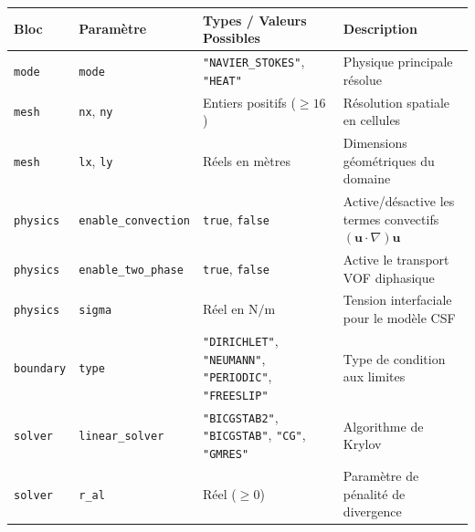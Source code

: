\documentclass[
  french,
]{article}
\newcounter{none} %
\begin{document}
{\def\LTcaptype{none} %
\begin{longtable}[]{@{}
  >{\raggedright\arraybackslash}p{}
  >{\raggedright\arraybackslash}p{}
  >{\raggedright\arraybackslash}p{}
  >{\raggedright\arraybackslash}p{}@{}}
\toprule\noalign{}
\begin{minipage}[b]{\linewidth}\raggedright
Bloc
\end{minipage} & \begin{minipage}[b]{\linewidth}\raggedright
Paramètre
\end{minipage} & \begin{minipage}[b]{\linewidth}\raggedright
Types / Valeurs Possibles
\end{minipage} & \begin{minipage}[b]{\linewidth}\raggedright
Description
\end{minipage} \\
\midrule\noalign{}
\endhead
\bottomrule\noalign{}
\endlastfoot
\texttt{mode} & \texttt{mode} & \texttt{"NAVIER\_STOKES"},
\texttt{"HEAT"} & Physique principale résolue \\
\texttt{mesh} & \texttt{nx}, \texttt{ny} & Entiers positifs (\(\ge 16\))
& Résolution spatiale en cellules \\
\texttt{mesh} & \texttt{lx}, \texttt{ly} & Réels en mètres & Dimensions
géométriques du domaine \\
\texttt{physics} & \texttt{enable\_convection} & \texttt{true},
\texttt{false} & Active/désactive les termes convectifs
\((\mathbf{u}\cdot\nabla)\mathbf{u}\) \\
\texttt{physics} & \texttt{enable\_two\_phase} & \texttt{true},
\texttt{false} & Active le transport VOF diphasique \\
\texttt{physics} & \texttt{sigma} & Réel en \(\text{N/m}\) & Tension
interfaciale pour le modèle CSF \\
\texttt{boundary} & \texttt{type} & \texttt{"DIRICHLET"},
\texttt{"NEUMANN"}, \texttt{"PERIODIC"}, \texttt{"FREESLIP"} & Type de
condition aux limites \\
\texttt{solver} & \texttt{linear\_solver} & \texttt{"BICGSTAB2"},
\texttt{"BICGSTAB"}, \texttt{"CG"}, \texttt{"GMRES"} & Algorithme de
Krylov \\
\texttt{solver} & \texttt{r\_al} & Réel (\(\ge 0\)) & Paramètre de
pénalité de divergence \\
\end{longtable}
}
\end{document}
